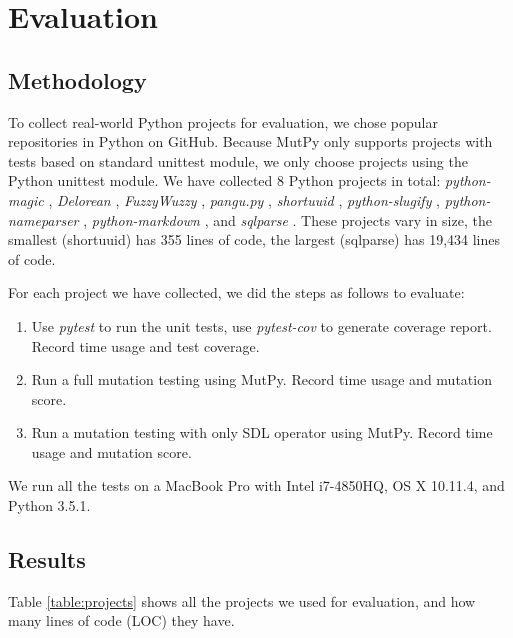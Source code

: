 \documentclass[12pt]{article}
\begin{document}
\section{Evaluation}

\subsection{Methodology}

To collect real-world Python projects for evaluation, we chose popular repositories in Python on GitHub. Because MutPy only supports projects with tests based on standard unittest module, we only choose projects using the Python unittest module. We have collected 8 Python projects in total: \emph{python-magic} \cite{python-magic}, \emph{Delorean} \cite{delorean}, \emph{FuzzyWuzzy} \cite{fuzzywuzzy}, \emph{pangu.py} \cite{pangu.py}, \emph{shortuuid} \cite{shortuuid}, \emph{python-slugify} \cite{python-slugify}, \emph{python-nameparser} \cite{python-nameparser}, \emph{python-markdown} \cite{python-markdown}, and \emph{sqlparse} \cite{sqlparse}. These projects vary in size, the smallest (shortuuid) has 355 lines of code, the largest (sqlparse) has 19,434 lines of code.

For each project we have collected, we did the steps as follows to evaluate:

\begin{enumerate}
  \item Use \emph{pytest} \cite{pytest} to run the unit tests, use \emph{pytest-cov} \cite{pytest-cov} to generate coverage report. Record time usage and test coverage.
  \item Run a full mutation testing using MutPy. Record time usage and mutation score.
  \item Run a mutation testing with only SDL operator using MutPy. Record time usage and mutation score.
\end{enumerate}

We run all the tests on a MacBook Pro with Intel i7-4850HQ, OS X 10.11.4, and Python 3.5.1.

\subsection{Results}

Table \ref{table:projects} shows all the projects we used for evaluation, and how many lines of code (LOC) they have.
\end{document}
